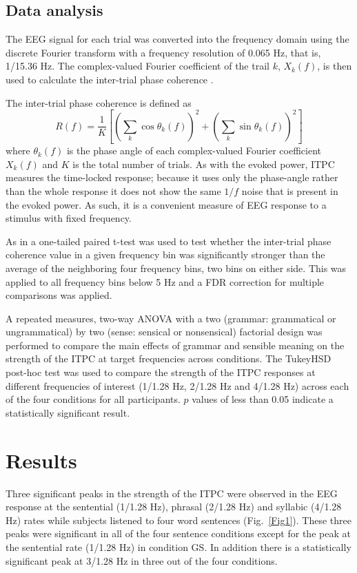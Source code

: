 \documentclass[a4paper,10pt,twoside]{article}
\begin{document}
{\subsection*{Data analysis}

The EEG signal for each trial was converted into the frequency
domain using the discrete Fourier transform with a frequency
resolution of 0.065 Hz, that is, 1/15.36 Hz. The complex-valued
Fourier coefficient of the trail $k$, $X_k(f)$, is then used to
calculate the inter-trial phase coherence .

The inter-trial phase coherence is defined as
\begin{equation}
\label{eq:itpc}
R(f)=\frac{1}{K}\left[\left(\sum_k{\cos{\theta_k(f)}}\right)^2+\left(\sum_k{\sin{\theta_k(f)}}\right)^2\right]
\end{equation}
where $\theta_k(f)$ is the phase angle of each complex-valued Fourier
coefficient $X_k(f)$ and $K$ is the total number of trials. As with
the evoked power, ITPC measures the time-locked response; because it
uses only the phase-angle rather than the whole response it does not
show the same $1/f$ noise that is present in the evoked power. As
such, it is a convenient measure of EEG response to a stimulus with
fixed frequency.

As in \cite{DingEtAl2016} a one-tailed paired t-test was used to test
whether the inter-trial phase coherence value in a given frequency bin
was significantly stronger than the average of the neighboring four
frequency bins, two bins on either side. This was applied to all
frequency bins below 5 Hz and a FDR correction for multiple
comparisons was applied.

A repeated measures, two-way ANOVA with a two (grammar: grammatical or
ungrammatical) by two (sense: sensical or nonsensical) factorial
design was performed to compare the main effects of grammar and
sensible meaning on the strength of the ITPC at target frequencies
across conditions. The TukeyHSD post-hoc test was used to compare the
strength of the ITPC responses at different frequencies of interest
(1/1.28 Hz, 2/1.28 Hz and 4/1.28 Hz) across each of the four
conditions for all participants. $p$ values of less than 0.05 indicate
a statistically significant result.


\section*{Results}

Three significant peaks in the strength of the ITPC were observed in
the EEG response at the sentential (1/1.28 Hz), phrasal (2/1.28 Hz)
and syllabic (4/1.28 Hz) rates while subjects listened to four word
sentences (Fig.~\ref{Fig1}). These three peaks were significant in all
of the four sentence conditions except for the peak at the sentential
rate (1/1.28 Hz) in condition GS. In addition there is a
statistically significant peak at 3/1.28 Hz in three out of the four
conditions.

}
\end{document}
